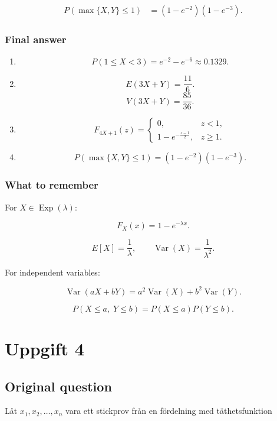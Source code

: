 \documentclass[10pt]{article}
\begin{document}
\begin{align*}
P(\max\{X,Y\}\leq 1)
&=(1-e^{-2})(1-e^{-3}).
\end{align*}

\subsubsection*{Final answer}
\begin{enumerate}[label=\alph*)]
\item
\[
P(1\leq X<3)
=e^{-2}-e^{-6}
\approx 0.1329.
\]

\item
\[
E(3X+Y)=\frac{11}{6}.
\]
\[
V(3X+Y)=\frac{85}{36}.
\]

\item
\[
F_{4X+1}(z)=
\begin{cases}
0, & z<1,\\[1mm]
1-e^{-\frac{z-1}{2}},
& z\geq 1.
\end{cases}
\]

\item
\[
P(\max\{X,Y\}\leq 1)
=(1-e^{-2})(1-e^{-3}).
\]
\end{enumerate}

\subsubsection*{What to remember}
For \(X\in \operatorname{Exp}(\lambda)\):

\[
F_X(x)=1-e^{-\lambda x}.
\]

\[
E[X]=\frac{1}{\lambda},
\qquad
\operatorname{Var}(X)=\frac{1}{\lambda^2}.
\]

For independent variables:

\[
\operatorname{Var}(aX+bY)
=a^2\operatorname{Var}(X)
 +b^2\operatorname{Var}(Y).
\]

\[
P(X\leq a,\;Y\leq b)
=P(X\leq a)P(Y\leq b).
\]

\section*{Uppgift 4}

\subsection*{Original question}
Låt \(x_1,x_2,\ldots,x_n\) vara ett stickprov
från en fördelning med täthetsfunktion
\end{document}

